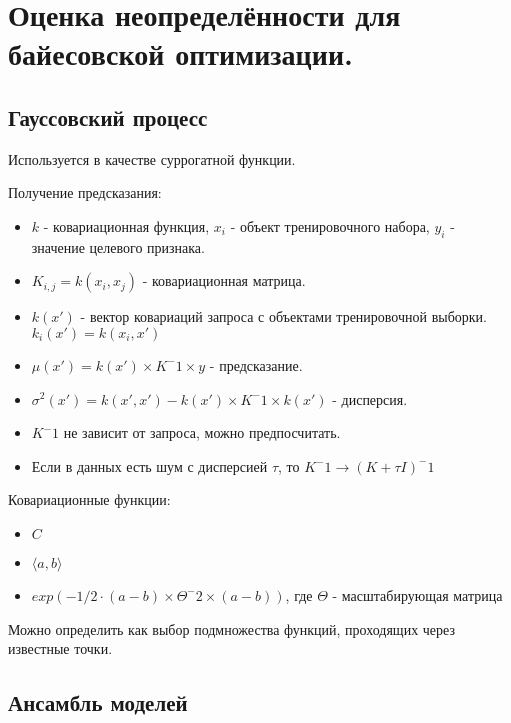 \section{Оценка неопределённости для байесовской оптимизации.}

\subsection*{Гауссовский процесс}


Используется в качестве суррогатной функции.

Получение предсказания:
\begin{itemize}
    \item $k$ - ковариационная функция, $x_i$ - объект тренировочного
    набора, $y_i$ - значение целевого признака.
    \item $K_{i, j} = k(x_i, x_j)$ - ковариационная матрица.
    \item $k(x')$ - вектор ковариаций запроса с объектами тренировочной выборки.
    $k_i(x') = k(x_i, x')$
    \item $\mu(x') = k(x') \times K^-1 \times y$ - предсказание.
    \item $\sigma^2(x') = k(x', x') - k(x') \times K^-1 \times k(x')$ - дисперсия.
    \item $K^-1$ не зависит от запроса, можно предпосчитать.
    \item Если в данных есть шум с дисперсией $\tau$, то
    $K^-1 \to (K + \tau I)^-1$
\end{itemize}

Ковариационные функции:
\begin{itemize}
    \item $C$
    \item $\langle a, b \rangle$
    \item $exp\left(- 1/2 \cdot (a - b) \times \Theta^-2 \times (a - b)\right)$,
    где $\Theta$ - масштабирующая матрица
\end{itemize}

Можно определить как выбор подмножества функций, проходящих через
известные точки.

\subsection*{Ансамбль моделей}

